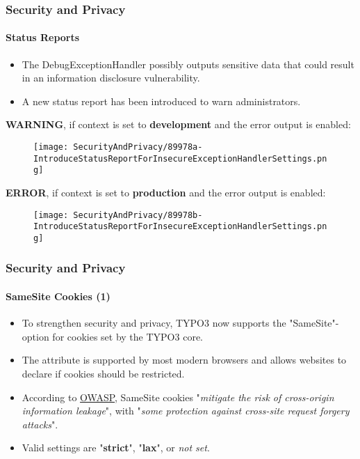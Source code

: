 \begin{frame}[fragile]
	\frametitle{Security and Privacy}
	\framesubtitle{Status Reports}

	\begin{itemize}
		\item The DebugExceptionHandler possibly outputs sensitive data that could
			result in an information disclosure vulnerability.
		\item A new status report has been introduced to warn administrators.
	\end{itemize}

	\vspace{0.4cm}
	\textbf{WARNING}, if context is set to \textbf{development} and the error output is enabled:
	\begin{figure}
		\texttt{[image: SecurityAndPrivacy/89978a-IntroduceStatusReportForInsecureExceptionHandlerSettings.png]}
	\end{figure}

	\textbf{ERROR}, if context is set to \textbf{production} and the error output is enabled:
	\begin{figure}
		\texttt{[image: SecurityAndPrivacy/89978b-IntroduceStatusReportForInsecureExceptionHandlerSettings.png]}
	\end{figure}

\end{frame}


\begin{frame}[fragile]
	\frametitle{Security and Privacy}
	\framesubtitle{SameSite Cookies (1)}

	\begin{itemize}
		\item To strengthen security and privacy, TYPO3 now supports the "SameSite"-option
			for cookies set by the TYPO3 core.
		\item The attribute is supported by most modern browsers and allows websites
			to declare if cookies should be restricted.
		\item According to
			\href{https://www.owasp.org/index.php/SameSite}{OWASP}, SameSite cookies\newline
			\small
				"\textit{mitigate the risk of cross-origin information leakage}", with\newline
				"\textit{some protection against cross-site request forgery attacks}".
			\normalsize

		\item Valid settings are "\textbf{strict}", "\textbf{lax}", or \textit{not set}.
	\end{itemize}

\end{frame}

